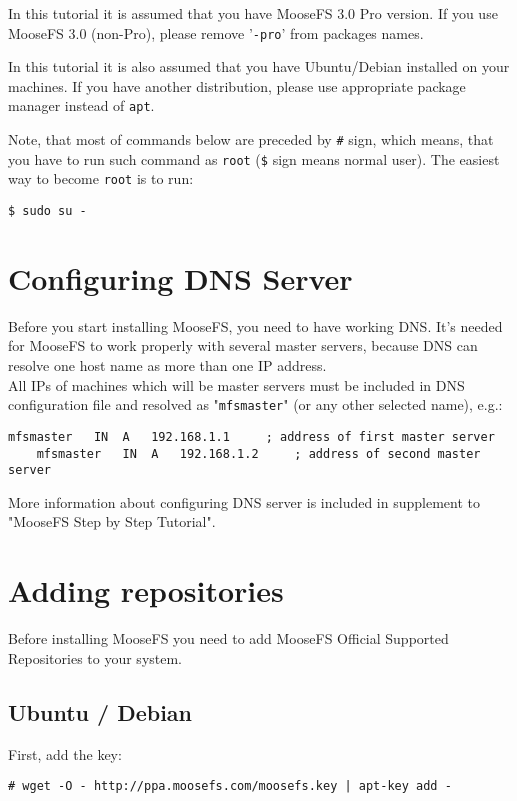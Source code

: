 \documentclass[a4paper,11pt,english]{report}
\def\code#1{\texttt{#1}}
\begin{document}
	In this tutorial it is assumed that you have MooseFS 3.0 Pro version. If you use MooseFS 3.0 (non-Pro), please remove '\code{-pro}' from packages names.
	
	\bigskip
	In this tutorial it is also assumed that you have Ubuntu/Debian installed on your machines. If you have another distribution, please use appropriate package manager instead of \code{apt}.	
	
	Note, that most of commands below are preceded by \code{\#} sign, which means, that you have to run such command as \code{root} (\code{\$} sign means normal user). The easiest way to become \code{root} is to run:
		
	\begin{lstlisting}[caption={Becoming \code{root}}]
	$ sudo su -
	\end{lstlisting}
		
		
		\section{Configuring DNS Server}
		Before you start installing MooseFS, you need to have working DNS. It's needed for MooseFS to work properly with several master servers, because DNS can resolve one host name as more than one IP address. \\
		All IPs of machines which will be master servers must be included in DNS configuration file and resolved as "\code{mfsmaster}" (or any other selected name), e.g.:

		\begin{lstlisting}[caption={DNS entries}]
	mfsmaster	IN	A	192.168.1.1		; address of first master server
	mfsmaster	IN	A	192.168.1.2		; address of second master server
		\end{lstlisting}
		
More information about configuring DNS server is included in supplement to "MooseFS Step by Step Tutorial".
		
		\section{Adding repositories}
		Before installing MooseFS you need to add MooseFS Official Supported Repositories to your system.
			\subsection{Ubuntu / Debian}
			First, add the key:
			\begin{lstlisting}[caption={Adding the repo key}]
	# wget -O - http://ppa.moosefs.com/moosefs.key | apt-key add -
			\end{lstlisting}
			
\end{document}
